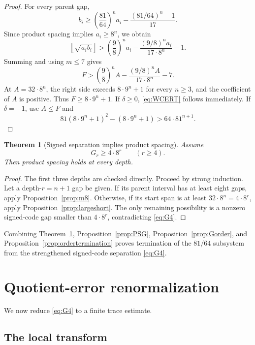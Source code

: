 \documentclass[11pt,reqno]{amsart}
\numberwithin{equation}{section}
\newtheorem{theorem}{Theorem}[section]
\theoremstyle{definition}
\theoremstyle{remark}
\begin{document}
\begin{proof}
For every parent gap,
\[
 b_i\ge
 \left(\frac{81}{64}\right)^n a_i
 -\frac{(81/64)^n-1}{17}.
\]
Since product spacing implies $a_i\ge8^n$, we obtain
\[
 \left\lfloor\sqrt{a_ib_i}\right\rfloor
 >
 \left(\frac98\right)^n a_i
 -\frac{(9/8)^n a_i}{17\cdot8^n}-1.
\]
Summing and using $m\le7$ gives
\[
 F>
 \left(\frac98\right)^n A
 -\frac{(9/8)^n A}{17\cdot8^n}-7.
\]
At $A=32\cdot8^n$, the right side exceeds $8\cdot9^n+1$ for every $n\ge3$, and the coefficient of $A$ is positive.  Thus $F\ge8\cdot9^n+1$.  If $\delta\ge0$, \eqref{eq:WCERT} follows immediately.  If $\delta=-1$, use $A\le F$ and
\[
 81(8\cdot9^n+1)^2-(8\cdot9^n+1)
 >64\cdot81^{n+1}.
\]
\end{proof}

\begin{theorem}[Signed separation implies product spacing]\label{thm:GtoPS}
Assume
\begin{equation}\label{eq:G4}
 G_r\ge4\cdot8^r
 \qquad(r\ge4).
\end{equation}
Then product spacing holds at every depth.
\end{theorem}

\begin{proof}
The first three depths are checked directly.  Proceed by strong induction.  Let a depth-$r=n+1$ gap be given.  If its parent interval has at least eight gaps, apply Proposition~\ref{prop:m8}.  Otherwise, if its start span is at least $32\cdot8^n=4\cdot8^r$, apply Proposition~\ref{prop:largeshort}.  The only remaining possibility is a nonzero signed-code gap smaller than $4\cdot8^r$, contradicting \eqref{eq:G4}.
\end{proof}

Combining Theorem~\ref{thm:GtoPS}, Proposition~\ref{prop:PSG}, Proposition~\ref{prop:Gorder}, and Proposition~\ref{prop:ordertermination} proves termination of the $81/64$ subsystem from the strengthened signed-code separation \eqref{eq:G4}.

\section{Quotient-error renormalization}\label{sec:trace}

We now reduce \eqref{eq:G4} to a finite trace estimate.

\subsection{The local transform}
\end{document}
